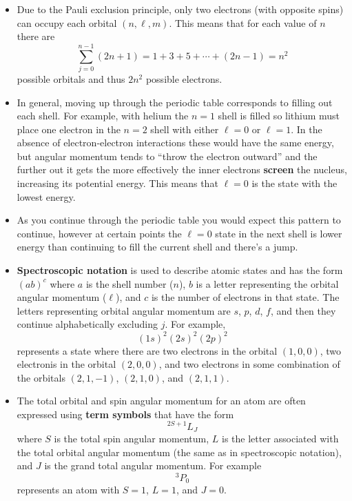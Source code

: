 \documentclass{article}
\begin{document}
\begin{itemize}
  \item Due to the Pauli exclusion principle, only two electrons (with opposite spins) can occupy each orbital $(n, \ell, m)$. This means that for each value of $n$ there are \[\sum_{j = 0}^{n - 1} (2 n + 1) = 1 + 3 + 5 + \cdots + (2 n - 1) = n^2\] possible orbitals and thus $2 n^2$ possible electrons.

  \item In general, moving up through the periodic table corresponds to filling out each shell. For example, with helium the $n = 1$ shell is filled so lithium must place one electron in the $n = 2$ shell with either $\ell = 0$ or $\ell = 1$. In the absence of electron-electron interactions these would have the same energy, but angular momentum tends to ``throw the electron outward'' and the further out it gets the more effectively the inner electrons \textbf{screen} the nucleus, increasing its potential energy. This means that $\ell = 0$ is the state with the lowest energy.

  \item As you continue through the periodic table you would expect this pattern to continue, however at certain points the $\ell = 0$ state in the next shell is lower energy than continuing to fill the current shell and there's a jump.

  \item \textbf{Spectroscopic notation} is used to describe atomic states and has the form $(a b)^c$ where $a$ is the shell number ($n$), $b$ is a letter representing the orbital angular momentum ($\ell$), and $c$ is the number of electrons in that state. The letters representing orbital angular momentum are $s$, $p$, $d$, $f$, and then they continue alphabetically excluding $j$. For example, \[(1 s)^2 (2 s)^2 (2 p)^2\] represents a state where there are two electrons in the orbital $(1, 0, 0)$, two electronis in the orbital $(2, 0, 0)$, and two electrons in some combination of the orbitals $(2, 1, -1)$, $(2, 1, 0)$, and $(2, 1, 1)$.

  \item The total orbital and spin angular momentum for an atom are often expressed using \textbf{term symbols} that have the form \[^{2 S + 1}L_J\] where $S$ is the total spin angular momentum, $L$ is the letter associated with the total orbital angular momentum (the same as in spectroscopic notation), and $J$ is the grand total angular momentum. For example \[^3 P_0\] represents an atom with $S = 1$, $L = 1$, and $J = 0$.
\end{itemize}
\end{document}
